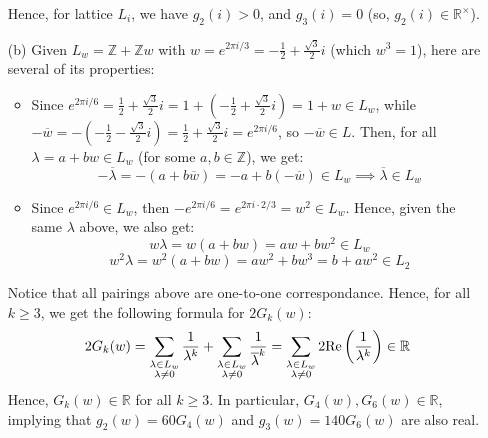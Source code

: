 \documentclass{article}
\begin{document}
\begin{itemize}
    Hence, for lattice $L_i$, we have $g_2(i)>0$, and $g_3(i)=0$ (so, $g_2(i)\in\mathbb{R}^\times$).

    \hfil
    
    \item[(b)] Given $L_w=\mathbb{Z}+\mathbb{Z}w$ with $w=e^{2\pi i/3} = -\frac{1}{2}+\frac{\sqrt{3}}{2}i$ (which $w^3 = 1$), here are several of its properties:
    \begin{itemize}
        \item Since $e^{2\pi i/6} = \frac{1}{2}+\frac{\sqrt{3}}{2}i = 1+(-\frac{1}{2}+\frac{\sqrt{3}}{2}i)= 1+w\in L_w$, while $-\overline{w} = -(-\frac{1}{2}-\frac{\sqrt{3}}{2}i) = \frac{1}{2}+\frac{\sqrt{3}}{2}i = e^{2\pi i/6}$, so $-\overline{w}\in L$. Then, for all $\lambda = a+bw\in L_w$ (for some $a,b\in\mathbb{Z}$), we get:
        $$-\overline{\lambda} = -(a+b\overline{w}) = -a+b(-\overline{w})\in L_w\implies\overline{\lambda}\in L_w$$
        \item Since $e^{2\pi i/6}\in L_w$, then $-e^{2\pi i/6} = e^{2\pi i\cdot2/3} = w^2\in L_w$. Hence, given the same $\lambda$ above, we also get:
        $$w\lambda = w(a+bw) = aw + bw^2 \in L_w$$
        $$w^2\lambda = w^2(a+bw) = aw^2+bw^3 = b+aw^2\in L_2$$
    \end{itemize}
    Notice that all pairings above are one-to-one correspondance. Hence, for all $k\geq 3$, we get the following formula for $2G_k(w)$:
    $$2G_k(w)=\sum_{\substack{\lambda\in L_w\\\lambda\neq 0}}\frac{1}{\lambda^k}+\sum_{\substack{\lambda\in L_w\\\lambda\neq 0}}\frac{1}{\overline{\lambda}^k} = \sum_{\substack{\lambda\in L_w\\\lambda\neq 0}}2\textmd{Re}\left(\frac{1}{\lambda^k}\right)\in \mathbb{R}$$ 
    Hence, $G_k(w)\in\mathbb{R}$ for all $k\geq 3$. In particular, $G_4(w),G_6(w)\in\mathbb{R}$, implying that $g_2(w)=60G_4(w)$ and $g_3(w)=140G_6(w)$ are also real.
    

\end{itemize}
\end{document}

